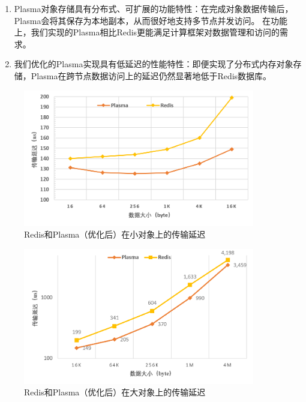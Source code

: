 \begin{enumerate}
    \item Plasma对象存储具有分布式、可扩展的功能特性：在完成对象数据传输后，Plasma会将其保存为本地副本，从而很好地支持多节点并发访问。
    在功能上，我们实现的Plasma相比Redis更能满足计算框架对数据管理和访问的需求。
    \item 我们优化的Plasma实现具有低延迟的性能特性：即便实现了分布式内存对象存储，Plasma在跨节点数据访问上的延迟仍然显著地低于Redis数据库。
\end{enumerate}

\begin{figure}[h]
	\centering
	\includegraphics[width=0.9\textwidth]{image/chap04/redis_small.png}
	\caption{Redis和Plasma（优化后）在小对象上的传输延迟}
	\label{fig:redis_small}
\end{figure}

\begin{figure}[h]
	\centering
	\includegraphics[width=0.9\textwidth]{image/chap04/redis_big.png}
	\caption{Redis和Plasma（优化后）在大对象上的传输延迟}
	\label{fig:redis_big}
\end{figure}